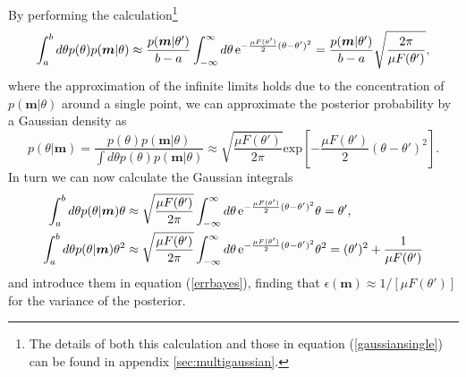 By performing the calculation\footnote{The details of both this calculation and those in equation (\ref{gaussiansingle}) can be found in appendix \ref{sec:multigaussian}.}
\begin{eqnarray}
\int_{a}^b d\theta p(\theta)p(\boldsymbol{m}|\theta)  \approx \frac{p(\boldsymbol{m}|\theta')}{b-a}\int_{-\infty}^\infty d\theta\hspace{0.15em} \mathrm{e}^{ - \frac{\mu F(\theta')}{2}(\theta - \theta')^2} = \frac{p(\boldsymbol{m}|\theta')}{b-a} \sqrt{\frac{2 \pi}{\mu F(\theta')}},
\label{norm_asy}
\end{eqnarray}
where the approximation of the infinite limits holds due to the concentration of $p(\boldsymbol{m}|\theta)$ around a single point, we can approximate the posterior probability by a Gaussian density as
\begin{equation}
p(\theta|\boldsymbol{m}) = \frac{p(\theta)p(\boldsymbol{m}|\theta)}{\int d\theta p(\theta)p(\boldsymbol{m}|\theta)}\approx \sqrt{\frac{\mu F(\theta')}{2\pi}} \mathrm{exp} \left[ -\frac{\mu F(\theta')}{2}(\theta - \theta')^2 \right].
\label{gaussian}
\end{equation}
In turn we can now calculate the Gaussian integrals
\begin{align}
\int_{a}^b d\theta p(\theta|\boldsymbol{m})\theta &\approx   \sqrt{\frac{\mu F(\theta')}{2 \pi}}\int_{-\infty}^\infty d\theta\hspace{0.15em}\mathrm{e}^{ - \frac{\mu F(\theta')}{2}(\theta - \theta')^2}\theta = \theta',
\nonumber \\
\int_{a}^b d\theta p(\theta|\boldsymbol{m})\theta^2 &\approx   \sqrt{\frac{\mu F(\theta')}{2 \pi}}\int_{-\infty}^\infty d\theta\hspace{0.15em} \mathrm{e}^{- \frac{\mu F(\theta')}{2}(\theta - \theta')^2}\theta^2 =  (\theta')^2 + \frac{1}{\mu F(\theta')}
\label{gaussiansingle}
\end{align}
and introduce them in equation (\ref{errbayes}), finding that $\epsilon(\boldsymbol{m}) \approx 1/[\mu F(\theta')]$ for the variance of the posterior. 

